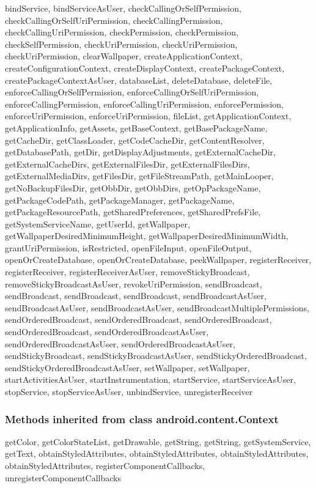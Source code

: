 bindService, bindServiceAsUser, checkCallingOrSelfPermission, checkCallingOrSelfUriPermission, checkCallingPermission, checkCallingUriPermission, checkPermission, checkPermission, checkSelfPermission, checkUriPermission, checkUriPermission, checkUriPermission, clearWallpaper, createApplicationContext, createConfigurationContext, createDisplayContext, createPackageContext, createPackageContextAsUser, databaseList, deleteDatabase, deleteFile, enforceCallingOrSelfPermission, enforceCallingOrSelfUriPermission, enforceCallingPermission, enforceCallingUriPermission, enforcePermission, enforceUriPermission, enforceUriPermission, fileList, getApplicationContext, getApplicationInfo, getAssets, getBaseContext, getBasePackageName, getCacheDir, getClassLoader, getCodeCacheDir, getContentResolver, getDatabasePath, getDir, getDisplayAdjustments, getExternalCacheDir, getExternalCacheDirs, getExternalFilesDir, getExternalFilesDirs, getExternalMediaDirs, getFilesDir, getFileStreamPath, getMainLooper, getNoBackupFilesDir, getObbDir, getObbDirs, getOpPackageName, getPackageCodePath, getPackageManager, getPackageName, getPackageResourcePath, getSharedPreferences, getSharedPrefsFile, getSystemServiceName, getUserId, getWallpaper, getWallpaperDesiredMinimumHeight, getWallpaperDesiredMinimumWidth, grantUriPermission, isRestricted, openFileInput, openFileOutput, openOrCreateDatabase, openOrCreateDatabase, peekWallpaper, registerReceiver, registerReceiver, registerReceiverAsUser, removeStickyBroadcast, removeStickyBroadcastAsUser, revokeUriPermission, sendBroadcast, sendBroadcast, sendBroadcast, sendBroadcast, sendBroadcastAsUser, sendBroadcastAsUser, sendBroadcastAsUser, sendBroadcastMultiplePermissions, sendOrderedBroadcast, sendOrderedBroadcast, sendOrderedBroadcast, sendOrderedBroadcast, sendOrderedBroadcastAsUser, sendOrderedBroadcastAsUser, sendOrderedBroadcastAsUser, sendStickyBroadcast, sendStickyBroadcastAsUser, sendStickyOrderedBroadcast, sendStickyOrderedBroadcastAsUser, setWallpaper, setWallpaper, startActivitiesAsUser, startInstrumentation, startService, startServiceAsUser, stopService, stopServiceAsUser, unbindService, unregisterReceiver\\

\subsubsection{Methods inherited from class android.content.Context}
getColor, getColorStateList, getDrawable, getString, getString, getSystemService, getText, obtainStyledAttributes, obtainStyledAttributes, obtainStyledAttributes, obtainStyledAttributes, registerComponentCallbacks, unregisterComponentCallbacks\\

